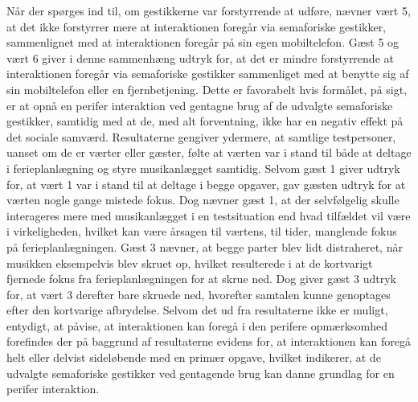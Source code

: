 Når der spørges ind til, om gestikkerne var forstyrrende at udføre, nævner vært 5, at det ikke forstyrrer mere at interaktionen foregår via semaforiske gestikker, sammenlignet med at interaktionen foregår på sin egen mobiltelefon. Gæst 5 og vært 6 giver i denne sammenhæng udtryk for, at det er mindre forstyrrende at interaktionen foregår via semaforiske gestikker sammenliget med at benytte sig af sin mobiltelefon eller en fjernbetjening. Dette er favorabelt hvis formålet, på sigt, er at opnå en perifer interaktion ved gentagne brug af de udvalgte semaforiske gestikker, samtidig med at de, med alt forventning, ikke har en negativ effekt på det sociale samværd. \blankline
%
Resultaterne gengiver ydermere, at samtlige testpersoner, uanset om de er værter eller gæster, følte at værten var i stand til både at deltage i ferieplanlægning og styre musikanlægget samtidig. Selvom gæst 1 giver udtryk for, at vært 1 var i stand til at deltage i begge opgaver, gav gæsten udtryk for at værten nogle gange mistede fokus. Dog nævner gæst 1, at der selvfølgelig skulle interageres mere med musikanlægget i en testsituation end hvad tilfældet vil være i virkeligheden, hvilket kan være årsagen til værtens, til tider, manglende fokus på ferieplanlægningen. Gæst 3 nævner, at begge parter blev lidt distraheret, når musikken eksempelvis blev skruet op, hvilket resulterede i at de kortvarigt fjernede fokus fra ferieplanlægningen for at skrue ned. Dog giver gæst 3 udtryk for, at vært 3 derefter bare skruede ned, hvorefter samtalen kunne genoptages efter den kortvarige afbrydelse. \blankline
%
Selvom det ud fra resultaterne ikke er muligt, entydigt, at påvise, at interaktionen kan foregå i den perifere opmærksomhed forefindes der på baggrund af resultaterne evidens for, at interaktionen kan foregå helt eller delvist sideløbende med en primær opgave, hvilket indikerer, at de udvalgte semaforiske gestikker ved gentagende brug kan danne grundlag for en perifer interaktion.

